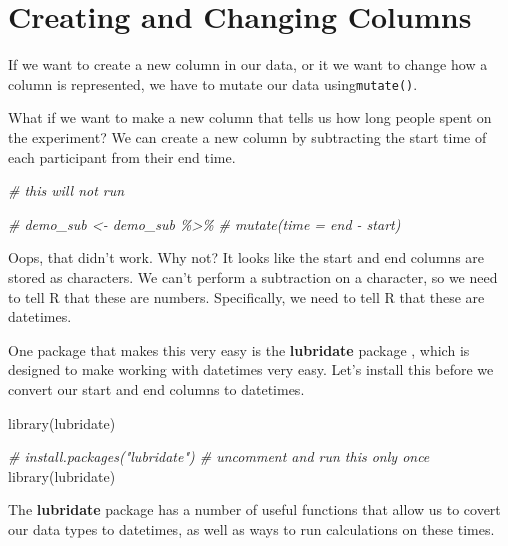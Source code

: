 \documentclass[
]{book}
\newenvironment{Shaded}{\begin{snugshade}}{\end{snugshade}}
\newcommand{\CommentTok}[1]{\textcolor[rgb]{0.56,0.35,0.01}{\textit{#1}}}
\newcommand{\FunctionTok}[1]{\textcolor[rgb]{0.00,0.00,0.00}{#1}}
\newcommand{\NormalTok}[1]{#1}
\begin{document}
\hypertarget{creating-and-changing-columns}{%
\section{Creating and Changing Columns}\label{creating-and-changing-columns}}

If we want to create a new column in our data, or it we want to change how a column is represented, we have to mutate our data using\texttt{mutate()}.

What if we want to make a new column that tells us how long people spent on the experiment? We can create a new column by subtracting the start time of each participant from their end time.

\begin{Shaded}
\begin{Highlighting}[]
\CommentTok{\# this will not run}

\CommentTok{\# demo\_sub \textless{}{-} demo\_sub \%\textgreater{}\%}
\CommentTok{\#  mutate(time = end {-} start)}
\end{Highlighting}
\end{Shaded}

Oops, that didn't work. Why not? It looks like the start and end columns are stored as characters. We can't perform a subtraction on a character, so we need to tell R that these are numbers. Specifically, we need to tell R that these are datetimes.

One package that makes this very easy is the \textbf{lubridate} package \citep{R-lubridate}, which is designed to make working with datetimes very easy. Let's install this before we convert our start and end columns to datetimes.

\begin{Shaded}
\begin{Highlighting}[]
\FunctionTok{library}\NormalTok{(lubridate)}
\end{Highlighting}
\end{Shaded}

\begin{Shaded}
\begin{Highlighting}[]
\CommentTok{\# install.packages("lubridate") \# uncomment and run this only once}
\FunctionTok{library}\NormalTok{(lubridate)}
\end{Highlighting}
\end{Shaded}

The \textbf{lubridate} package has a number of useful functions that allow us to covert our data types to datetimes, as well as ways to run calculations on these times.
\end{document}
